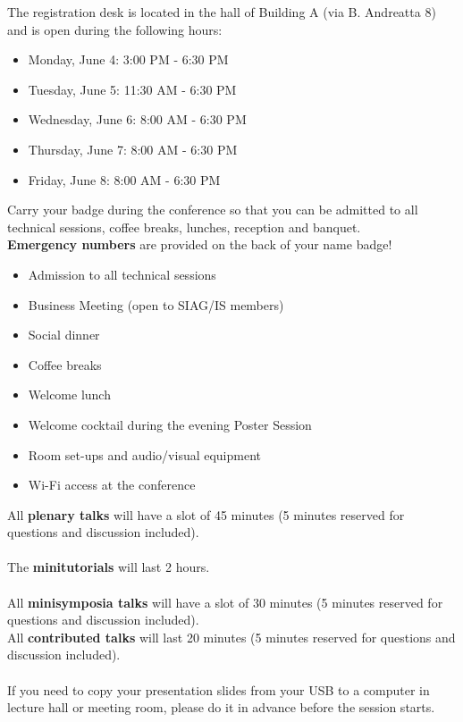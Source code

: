 \newpage

The registration desk is located in the hall of Building A (via B. Andreatta 8) and is open during the following hours:

\bigskip

\begin{itemize}
  \item[] Monday, June 4: 3:00 PM - 6:30 PM
  \item[] Tuesday, June 5: 11:30 AM - 6:30 PM
  \item[] Wednesday, June 6: 8:00 AM - 6:30 PM
  \item[] Thursday, June 7: 8:00 AM - 6:30 PM
  \item[] Friday, June 8: 8:00 AM - 6:30 PM
\end{itemize}

Carry your badge during the conference so that you can be admitted to all technical sessions, coffee breaks, lunches, reception and banquet.\\
\textbf{Emergency numbers} are provided on the back of your name badge! 


\bigskip

\begin{itemize}
  \item[] Admission to all technical sessions
  \item[] Business Meeting (open to SIAG/IS members)
  \item[] Social dinner
  \item[] Coffee breaks 
  \item[] Welcome lunch 
  \item[] Welcome cocktail during the evening Poster Session
  \item[] Room set-ups and audio/visual equipment
  \item[] Wi-Fi access at the conference
\end{itemize}%



\noindent All \textbf{plenary talks} will have a slot of 45 minutes
(5 minutes reserved for questions and discussion included).\\\\
The \textbf{minitutorials} will last 2 hours.\\\\
All \textbf{minisymposia talks} will have a slot of 30 minutes (5 minutes reserved for questions and discussion included).\\
All \textbf{contributed talks} will last 20 minutes (5 minutes reserved for questions and discussion included).\\\\
If you need to copy your presentation slides from your USB to a computer in lecture hall or meeting room, please do it in advance before
the session starts.

